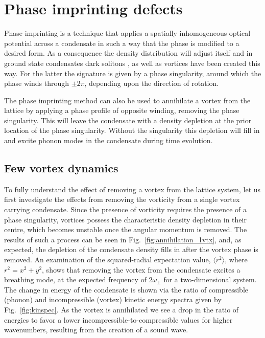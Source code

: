 \section{Phase imprinting defects}\label{sec:phase}


Phase imprinting is a technique that applies a spatially inhomogeneous optical potential across a condensate in such a way that the phase is modified to a desired form. As a consequence the density distribution will adjust itself and in ground state condensates dark solitons \cite{BEC:Denschlag_science_2000}, as well as vortices \cite{Vtx:Dobrek_pra_1999} have been created this way. For the latter the signature is given by a phase singularity, around which the phase winds through $\pm 2\pi$, depending upon the direction of rotation.

The phase imprinting method can also be used to annihilate a vortex from the lattice by applying a phase profile of opposite winding, removing the phase singularity.  This will leave the condensate with a density depletion at the prior location of the phase singularity. Without the singularity this depletion will fill in and excite phonon modes in the condensate during time evolution.


\subsection{Few vortex dynamics}

To fully understand the effect of removing a vortex from the lattice system, let us first investigate the effects from removing the vorticity from a single vortex carrying condensate. Since the presence of vorticity requires the presence of a phase singularity, vortices possess the characteristic density depletion in their centre, which becomes unstable once the angular momentum is removed. The results of such a process can be seen in Fig.~\ref{fig:annihilation_1vtx}, and, as expected, the depletion of the condensate density fills in after the vortex phase is removed. An examination of the squared-radial expectation value, $\langle r^2 \rangle$, where $r^2 = x^2 + y^2$, shows that removing the vortex from the condensate excites a breathing mode, at the expected frequency of $2\omega_\perp$ for a two-dimensional system. The change in energy of the condensate is shown via the ratio of compressible (phonon) and incompressible (vortex) kinetic energy spectra given by Fig.~\ref{fig:kinspec}. As the vortex is annihilated we see a drop in the ratio of energies to favor a lower incompressible-to-compressible values for higher wavenumbers, resulting from the creation of a sound wave.

